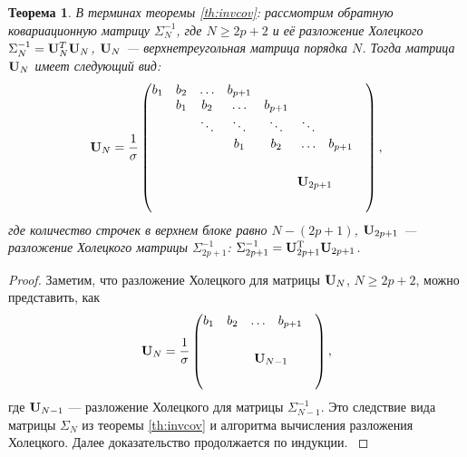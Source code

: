\documentclass[12pt,a4paper]{article}
\newtheorem{theorem}{Теорема}
\begin{document}
\begin{theorem}\label{th:invcov_chol}
	В терминах теоремы \ref{th:invcov}: рассмотрим обратную ковариационную матрицу $\Sigma_N^{-1}$, где $N \ge 2p + 2$ и её разложение Холецкого $\Sigma_N^{-1} = \mathbf{U}^T_N \mathbf{U}_N$, $\mathbf{U}_N$ --- верхнетреугольная матрица порядка $N$. Тогда матрица $\mathbf{U}_N$ имеет следующий вид:
	\begin{equation*}
	\bfU_N = \frac{1}{\sigma} \begin{pmatrix}
	b_1 & b_2 & \ldots & b_{p+1} &  &  &  &  \\ 
	& b_1 & b_2 & \ldots & b_{p+1} &  &  &  \\ 
	&  & \ddots & \ddots & \ddots & \ddots &  &  \\ 
	&  &  & b_1 & b_2 & \ldots & b_{p+1} &  \\ 
	&  &  &  & \multicolumn{4}{c}{\multirow{4}{*}{$\bfU_{2p+1}$}} \\
	&  &  &  & \multicolumn{4}{c}{\multirow{4}{*}{}} \\
	&  &  &  & \multicolumn{4}{c}{\multirow{4}{*}{}} \\
	&  &  &  & \multicolumn{4}{c}{\multirow{4}{*}{}}	
	\end{pmatrix},
	\end{equation*}
	где количество строчек в верхнем блоке равно $N - (2p + 1)$, $\mathbf{U}_{2p+1}$ --- разложение Холецкого матрицы $\Sigma_{2p+1}^{-1}$: $\Sigma_{2p+1}^{-1} = \mathbf{U}_{2p+1}^{\mathrm{T}} \mathbf{U}_{2p+1}$.
\end{theorem}
\begin{proof}
	Заметим, что разложение Холецкого для матрицы $\mathbf{U}_N$, $N \ge 2p + 2$, можно представить, как
	\begin{equation*}
	\bfU_N = \frac{1}{\sigma} \begin{pmatrix}
	b_1 & b_2 & \ldots & b_{p+1} &  \\ 
	& \multicolumn{4}{c}{\multirow{4}{*}{$\bfU_{N - 1}$}} \\
	& \multicolumn{4}{c}{\multirow{4}{*}{}} \\
	& \multicolumn{4}{c}{\multirow{4}{*}{}} \\
	& \multicolumn{4}{c}{\multirow{4}{*}{}}	
	\end{pmatrix},
	\end{equation*}	
	где $\mathbf{U}_{N-1}$ --- разложение Холецкого для матрицы $\Sigma_{N-1}^{-1}$. Это следствие вида матрицы $\Sigma_{N}$ из теоремы \ref{th:invcov} и алгоритма вычисления разложения Холецкого. Далее доказательство продолжается по индукции. \cite{stoica2005spectral}
\end{proof}



\end{document}
